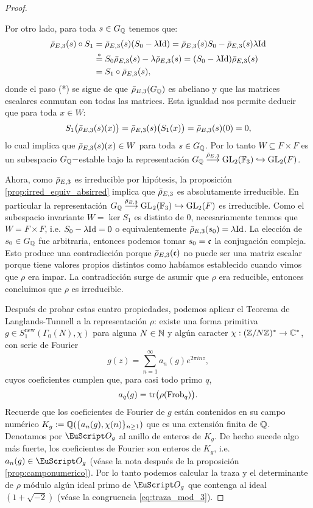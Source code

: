 \documentclass[../../tesis_maestria]{subfiles}
\begin{document}
\begin{proof}
\begin{enumerate}[label=\emph{\roman*})]
\-\;\; Por otro lado, para toda $s\in G_{\mathbb{Q}}$ tenemos que:
\begin{align*}
  \bar{\rho}_{E,3}(s)\circ S_1
  &=\bar{\rho}_{E,3}(s)(S_0-\lambda\mathrm{Id})=\bar{\rho}_{E,3}(s)S_0-\bar{\rho}_{E,3}(s)\lambda\mathrm{Id}\\
  &\overset{*}{=}S_0\bar{\rho}_{E,3}(s)-\lambda\bar{\rho}_{E,3}(s)=(S_0-\lambda\mathrm{Id})\bar{\rho}_{E,3}(s)\\
  &=S_1\circ\bar{\rho}_{E,3}(s),
\end{align*}
donde el paso (*) se sigue de que $\bar{\rho}_{E,3}(G_{\mathbb{Q}})$ es abeliano y que las matrices escalares conmutan con todas las matrices. Esta igualdad nos permite deducir que para toda $x\in W$:
\[
  S_1\big(\bar{\rho}_{E,3}(s)(x)\big)=\bar{\rho}_{E,3}(s)\big(S_1(x)\big)=\bar{\rho}_{E,3}(s)(0)=0,
\]
lo cual implica que $\bar{\rho}_{E,3}(s)(x)\in W$ para toda $s\in G_{\mathbb{Q}}$. Por lo tanto $W\subseteq F\times F$ es un subespacio $G_{\mathbb{Q}}-$estable bajo la representaci\'on $G_{\mathbb{Q}}\overset{\bar{\rho}_{E,3}}{\longrightarrow}\mathrm{GL}_2(\mathbb{F}_3)\hookrightarrow\mathrm{GL}_2(F)$.

\-\;\; Ahora, como $\bar{\rho}_{E,3}$ es irreducible por hip\'otesis, la proposici\'on \ref{prop:irred_equiv_absirred} implica que $\bar{\rho}_{E,3}$ es absolutamente irreducible. En particular la representaci\'on $G_{\mathbb{Q}}\overset{\bar{\rho}_{E,3}}{\longrightarrow}\mathrm{GL}_2(\mathbb{F}_3)\hookrightarrow\mathrm{GL}_2(F)$ es irreducible. Como el subespacio invariante $W=\ker S_1$ es distinto de 0, necesariamente tenmos que $W=F\times F$, i.e. $S_0-\lambda\mathrm{Id}=0$ o equivalentemente $\bar{\rho}_{E,3}(s_0)=\lambda\mathrm{Id}$. La elecci\'on de $s_0\in G_{\mathbb{Q}}$ fue arbitraria, entonces podemos tomar $s_0=\mathfrak{c}$ la conjugaci\'on compleja. Esto produce una contradicci\'on porque $\bar{\rho}_{E,3}(\mathfrak{c})$ no puede ser una matriz escalar porque tiene valores propios distintos como hab\'iamos establecido cuando vimos que $\rho$ era impar. La contradicci\'on surge de asumir que $\rho$ era reducible, entonces concluimos que $\rho$ es irreducible.
\end{enumerate}


Despu\'es de probar estas cuatro propiedades, podemos aplicar el Teorema de Langlands-Tunnell a la representaci\'on $\rho$: existe una forma primitiva $g\in S_1^{\mathrm{new}}(\Gamma_0(N),\chi)$ para alguna $N\in\mathbb{N}$ y alg\'un caracter $\chi:(\mathbb{Z}/N\mathbb{Z})^*\rightarrow\mathbb{C}^*$, con serie de Fourier
  \[
    g(z)=\sum_{n=1}^{\infty}a_n(g)e^{2\pi i nz},
  \]
cuyos coeficientes cumplen que, para casi todo primo $q$,
  \begin{equation}\label{eq:g_tr_fourier}
    a_q(g)=\mathrm{tr}\big(\rho(\mathrm{Frob}_q)\big).
  \end{equation}
  Recuerde que los coeficientes de Fourier de $g$ est\'an contenidos en su campo num\'erico $K_g:=\mathbb{Q}(\{a_n(g),\chi(n)\}_{n\geq1})$ que es una extensi\'on finita de $\mathbb{Q}$. Denotamos por $\Oo_g$ al anillo de enteros de $K_g$. De hecho sucede algo m\'as fuerte, los coeficientes de Fourier son enteros de $K_g$, i.e. $a_n(g)\in\Oo_g$ (v\'ease la nota despu\'es de la proposici\'on \ref{prop:camponumerico}). Por lo tanto podemos calcular la traza y el determinante de $\rho$ m\'odulo alg\'un ideal primo de $\Oo_g$ que contenga al ideal $(1+\sqrt{-2})$ (v\'ease la congruencia \eqref{eq:traza_mod_3}).
  

\end{proof}
\end{document}
